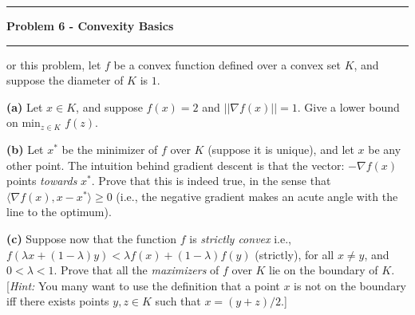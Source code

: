 \documentclass[11pt]{article}
\newcommand\question[2]{\vspace{.25in}\hrule\textbf{#1}\vspace{.5em}\hrule\vspace{.10in}}
\renewcommand\part[1]{\vspace{.10in}\textbf{(#1)}}
\begin{document}
\raggedright

\newcommand\NAME{Jake Pitkin}
\newcommand\UID{u0891770}
\newcommand\HWNUM{2}

\question{Problem 6 - Convexity Basics}

For this problem, let $f$ be a convex function defined over a convex set $K$, and suppose the diameter of $K$ is $1$.

\part{a} Let $x \in K$, and suppose $f(x) = 2$ and $\vert \vert \nabla f(x) \vert \vert = 1$. Give a lower bound on min$_{z \in K}$ $f(z)$.


\part{b} Let $x^*$ be the minimizer of $f$ over $K$ (suppose it is unique), and let $x$ be any other point. The intuition behind gradient descent is that the vector: $- \nabla f(x)$ points \textit{towards} $x^*$. Prove that this is indeed true, in the sense that $\langle \nabla f(x), x - x^* \rangle \geq 0$ (i.e., the negative gradient makes an acute angle with the line to the optimum).


\part{c} Suppose now that the function $f$ is \textit{strictly convex} i.e., $f(\lambda x + (1 - \lambda) y) < \lambda f(x) + (1 - \lambda) f(y)$ (strictly), for all $x \neq y$, and $0 < \lambda < 1$. Prove that all the \textit{maximizers} of $f$ over $K$ lie on the boundary of $K$. [\textit{Hint:} You many want to use the definition that a point $x$ is not on the boundary iff there exists points $y, z \in K$ such that $x = (y + z)/2$.]
\end{document}
